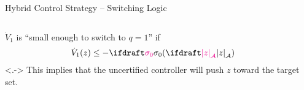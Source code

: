 \documentclass[notheorems, aspectratio=169, presentation]{beamer}
\newcommand{\itemnote}[1]{\note[item]<.->{#1}}
\begin{document}
\newcommand{\calZholdzerodef}{\{z \in \plantstatespace \mid \dot V_1(z) \geq -\sigmazero(\distA{z})\}}
\newcommand{\calZswitchtoonedef}{\{z \in \plantstatespace \mid \dot V_1(z) \leq -\sigmazero(\distA{z})\}}

\begin{frame}[t]{Hybrid Control Strategy -- Switching Logic}
  \VonedotDefinition

  \begin{minipage}[t][\minipageheight][t]{\linewidth}
  \begin{columns}
    \begin{column}[T]{0.5\textwidth}
      {\large{}}\smallskip

      $\dot V_1$ is 
      ``small enough to switch to $q=1$''
      if 
      $$\dot V_1(z) \leq -\sigmazero(\distA{z})$$
      \itemnote{
        This implies that the uncertified controller will 
        push $z$ toward the target set.
      }
    \end{column}
    \begin{column}[T]{0.5\textwidth}
      \vspace{-9pt}
        \begin{center}
         \end{center}
    \end{column}
  \end{columns}
  \end{minipage}
\end{frame}
\end{document}
